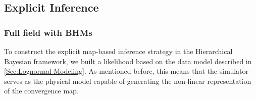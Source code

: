 \documentclass{aa}
\begin{document}
\subsection{Explicit Inference}
\subsubsection{Full field with BHMs}
To construct the explicit map-based inference strategy in the Hierarchical Bayesian framework, we built a likelihood based on the data model described in \autoref{Sec:Lognormal Modeling}. 
As mentioned before, this means that the simulator serves as the physical model capable of generating the non-linear representation of the convergence map.
\end{document}
